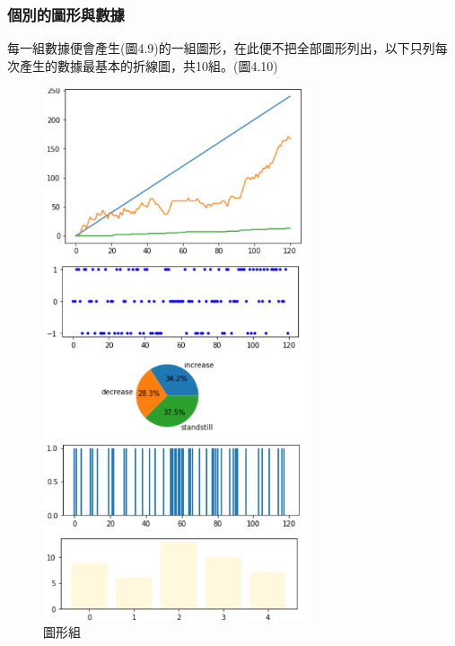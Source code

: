 \subsubsection{個別的圖形與數據}
每一組數據便會產生(圖4.9)的一組圖形，在此便不把全部圖形列出，以下只列每次產生的數據最基本的折線圖，共10組。(圖4.10)
	\begin{figure}[H] 
	\centering 
	\includegraphics[width=0.7\textwidth]{4_5.png} 
	\caption{圖形組} 
	\label{Fig.4.5} 
	\end{figure}
